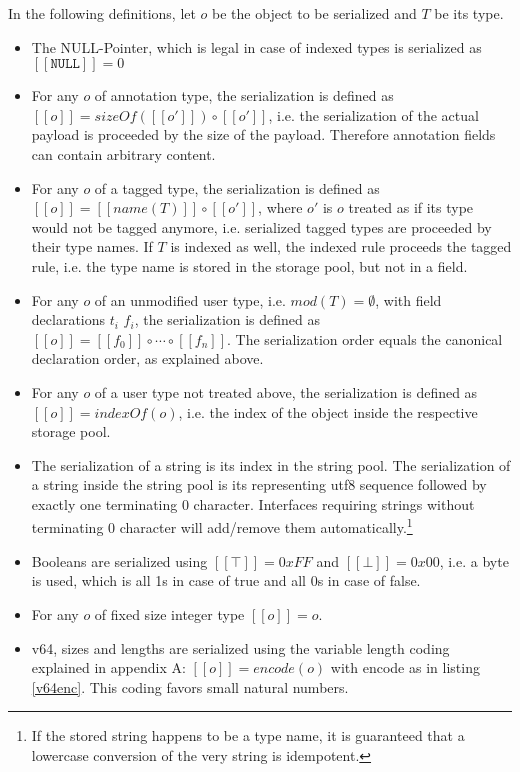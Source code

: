 \documentclass[a4paper,10pt]{article}
\newcommand{\den}[1]{[\![#1]\!]}
\begin{document}
In the following definitions, let $o$ be the object to be serialized and $T$ be its type.
\begin{itemize}
 \item The NULL-Pointer, which is legal in case of indexed types is serialized as $\den{\texttt{NULL}} = 0$
 \item For any $o$ of annotation type, the serialization is defined as $\den{o} = sizeOf(\den{o'}) \circ \den{o'}$, i.e. the serialization of the actual payload is proceeded by the size of the payload. Therefore annotation fields can contain arbitrary content.
 \item For any $o$ of a tagged type, the serialization is defined as $\den{o} = \den{name(T)} \circ \den{o'}$, where $o'$ is $o$ treated as if its type would not be tagged anymore, i.e. serialized tagged types are proceeded by their type names. If $T$ is indexed as well, the indexed rule proceeds the tagged rule, i.e. the type name is stored in the storage pool, but not in a field.
 \item For any $o$ of an unmodified user type, i.e. $mod(T)=\emptyset$, with field declarations $t_i$ $f_i$, the serialization is defined as $\den{o} = \den{f_0} \circ \cdots \circ \den{f_n}$. The serialization order equals the canonical declaration order, as explained above.
 \item For any $o$ of a user type not treated above, the serialization is defined as $\den{o} = indexOf(o)$, i.e. the index of the object inside the respective storage pool.
 
 \item The serialization of a string is its index in the string pool. The serialization of a string inside the string pool is its representing utf8 sequence followed by exactly one terminating 0 character. Interfaces requiring strings without terminating 0 character will add/remove them automatically.\footnote{If the stored string happens to be a type name, it is guaranteed that a lowercase conversion of the very string is idempotent.}
 \item Booleans are serialized using $\den{\top} = 0xFF$ and $\den{\bot} = 0x00$, i.e. a byte is used, which is all 1s in case of true and all 0s in case of false.
 
 \item For any $o$ of fixed size integer type $\den{o} = o$.
 \item v64, sizes and lengths are serialized using the variable length coding explained in appendix A: $\den{o} = encode(o)$ with encode as in listing \ref{v64enc}. This coding favors small natural numbers.
 

\end{itemize}
\end{document}
